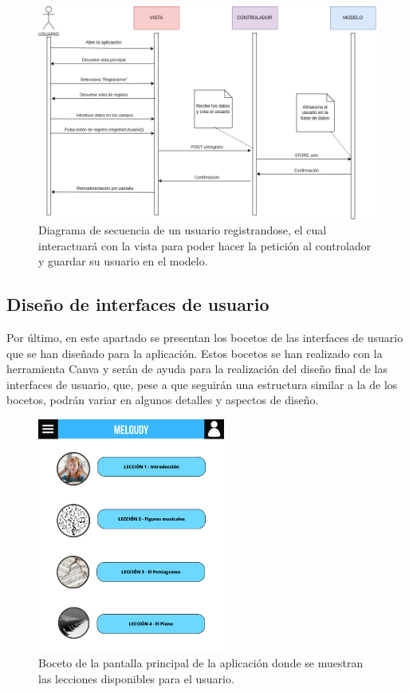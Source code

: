 \begin{figure}[H]
    \centering
    \centerline{\includegraphics[width=\textwidth]{imagenes/c6/diagramadesecuencia.png}}
    \caption{Diagrama de secuencia de un usuario registrandose, el cual interactuará con la vista para poder hacer la petición al controlador y guardar su usuario en el modelo.}
    \label{fig:diagramadesecuencia}    
\end{figure}


\subsection{Diseño de interfaces de usuario}
Por último, en este apartado se presentan los bocetos de las interfaces de usuario que se han diseñado para la aplicación. Estos bocetos se han realizado con la herramienta Canva y serán de ayuda para la realización del diseño final de las interfaces de usuario,
que, pese a que seguirán una estructura similar a la de los bocetos, podrán variar en algunos detalles y aspectos de diseño.

\begin{figure}[H]
    \centering
    \centerline{\includegraphics[width=0.55\textwidth, frame]{imagenes/c6/1.png}}
    \caption{Boceto de la pantalla principal de la aplicación donde se muestran las lecciones disponibles para el usuario.}
    \label{fig:pantallaprincipal}
    
    
\end{figure}

